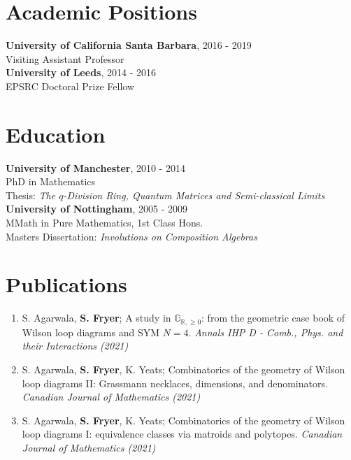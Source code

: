 \documentclass[margin]{res} %
\begin{document}
\begin{resume}
\section{\sc Academic Positions}
\textbf{University of California Santa Barbara}, 2016 - 2019 \\
Visiting Assistant Professor\\[0.3em]
\textbf{University of Leeds}, 2014 - 2016 \\
EPSRC Doctoral Prize Fellow

\section{\sc Education}

\textbf{University of Manchester}, 2010 - 2014 \\
PhD in Mathematics \\
Thesis: \textit{The $q$-Division Ring, Quantum Matrices and Semi-classical Limits} \\
\textbf{University of Nottingham}, 2005 - 2009 \\
MMath in Pure Mathematics, 1st Class Hons. \\
Masters Dissertation: \textit{Involutions on Composition Algebras}\\

 
\section{\sc Publications}
\begin{enumerate}[leftmargin=*]
\item S. Agarwala, {\bf S. Fryer}; A study in $\mathbb{G}_{\mathbb{R},\geq 0}$: from the geometric case book of Wilson loop diagrams and SYM $N = 4$. {\em Annals IHP D - Comb., Phys. and their Interactions (2021)}
\item S. Agarwala, {\bf S. Fryer}, K. Yeats; Combinatorics of the geometry of Wilson loop diagrams II: Grassmann necklaces, dimensions, and denominators. {\em Canadian Journal of Mathematics (2021)}
\item S. Agarwala, {\bf S. Fryer}, K. Yeats; Combinatorics of the geometry of Wilson loop diagrams I: equivalence classes via matroids and polytopes. {\em Canadian Journal of Mathematics (2021)}


\end{enumerate}
\end{resume}
\end{document}
